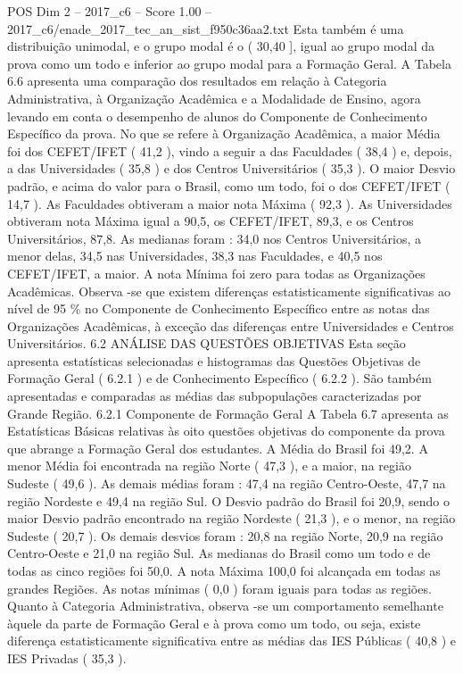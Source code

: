 \begin{textsample}{POS Dim 2 – 2017\_c6 – Score 1.00 – 2017\_c6/enade\_2017\_tec\_an\_sist\_f950c36aa2.txt}
Esta também é uma distribuição unimodal, e o grupo modal é o ( 30,40 ], igual ao grupo modal da prova como um todo e inferior ao grupo modal para a Formação Geral.
A Tabela 6.6 apresenta uma comparação dos resultados em relação à Categoria Administrativa, à Organização Acadêmica e a Modalidade de Ensino, agora levando em conta o desempenho de alunos do Componente de Conhecimento Específico da prova.
No que se refere à Organização Acadêmica, a maior Média foi dos CEFET/IFET ( 41,2 ), vindo a seguir a das Faculdades ( 38,4 ) e, depois, a das Universidades ( 35,8 ) e dos Centros Universitários ( 35,3 ).
O maior Desvio padrão, e acima do valor para o Brasil, como um todo, foi o dos CEFET/IFET ( 14,7 ).
As Faculdades obtiveram a maior nota Máxima ( 92,3 ).
As Universidades obtiveram nota Máxima igual a 90,5, os CEFET/IFET, 89,3, e os Centros Universitários, 87,8.
As medianas foram : 34,0 nos Centros Universitários, a menor delas, 34,5 nas Universidades, 38,3 nas Faculdades, e 40,5 nos CEFET/IFET, a maior.
A nota Mínima foi zero para todas as Organizações Acadêmicas.
Observa -se que existem diferenças estatisticamente significativas ao nível de 95 \% no Componente de Conhecimento Específico entre as notas das Organizações Acadêmicas, à exceção das diferenças entre Universidades e Centros Universitários. 6.2 ANÁLISE DAS QUESTÕES OBJETIVAS Esta seção apresenta estatísticas selecionadas e histogramas das Questões Objetivas de Formação Geral ( 6.2.1 ) e de Conhecimento Específico ( 6.2.2 ).
São também apresentadas e comparadas as médias das subpopulações caracterizadas por Grande Região. 6.2.1 Componente de Formação Geral A Tabela 6.7 apresenta as Estatísticas Básicas relativas às oito questões objetivas do componente da prova que abrange a Formação Geral dos estudantes.
A Média do Brasil foi 49,2.
A menor Média foi encontrada na região Norte ( 47,3 ), e a maior, na região Sudeste ( 49,6 ).
As demais médias foram : 47,4 na região Centro-Oeste, 47,7 na região Nordeste e 49,4 na região Sul.
O Desvio padrão do Brasil foi 20,9, sendo o maior Desvio padrão encontrado na região Nordeste ( 21,3 ), e o menor, na região Sudeste ( 20,7 ).
Os demais desvios foram : 20,8 na região Norte, 20,9 na região Centro-Oeste e 21,0 na região Sul.
As medianas do Brasil como um todo e de todas as cinco regiões foi 50,0.
A nota Máxima 100,0 foi alcançada em todas as grandes Regiões.
As notas mínimas ( 0,0 ) foram iguais para todas as regiões.
Quanto à Categoria Administrativa, observa -se um comportamento semelhante àquele da parte de Formação Geral e à prova como um todo, ou seja, existe diferença estatisticamente significativa entre as médias das IES Públicas ( 40,8 ) e IES Privadas ( 35,3 ).

\end{textsample}
